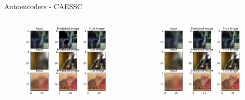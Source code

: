\documentclass{beamer}
\begin{document}
\begin{frame}{Autoencoders - CAESSC\cite{CAESSC}}
{\begin{columns}
\begin{column}[t]{0.33\paperwidth}
\begin{figure}[H]
                    \includegraphics[width=0.3\paperwidth,keepaspectratio]{caessc/test_CAESSC_d22_f128_half_no_sigmoid.pdf}
                    \caption{}                         
                \end{figure}
            \end{column}
            \begin{column}[t]{0.33\paperwidth}
                \begin{figure}
                    \centering
                    \includegraphics[width=0.3\paperwidth,keepaspectratio]{caessc/test_CAESSC_d22_f128_half.pdf}               

\end{figure}
\end{column}
\end{columns}}
\end{frame}
\end{document}
